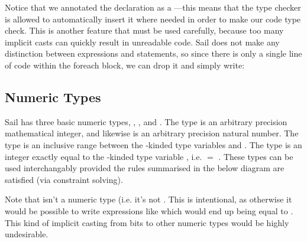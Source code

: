 Notice that we annotated the  declaration as a
---this means that the type checker is allowed to
automatically insert it where needed in order to make our code type
check. This is another feature that must be used carefully, because
too many implicit casts can quickly result in unreadable code. Sail
does not make any distinction between expressions and statements, so
since there is only a single line of code within the foreach block, we
can drop it and simply write: \mrbfnmyreplicatebitsthree

\subsection{Numeric Types}

Sail has three basic numeric types, , , and
. The type  is an arbitrary precision mathematical
integer, and likewise  is an arbitrary precision natural
number. The type  is an inclusive range between the
-kinded type variables  and . The type
 is an integer exactly equal to the -kinded type
variable , i.e.  $=$ . These types
can be used interchangably provided the rules summarised in the below
diagram are satisfied (via constraint solving).

\begin{center}
\end{center}

Note that  isn't a numeric type (i.e. it's not
. This is intentional, as otherwise it would be
possible to write expressions like  which would end
up being equal to . This kind of implicit casting
from bits to other numeric types would be highly undesirable.

